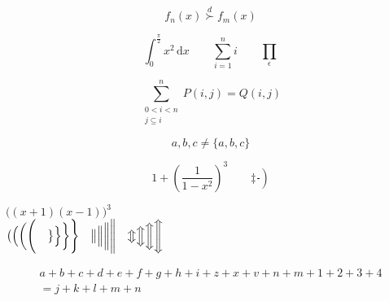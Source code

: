 \documentclass[a4paper,11pt]{report}
\begin{document}
\begin{equation*}
  f_n(x) \stackrel{d}{\succ} f_m(x)
\end{equation*}

\begin{equation*}
  \int_0^{\frac{\pi}{2}} x^2 \, \mathrm{d}x \qquad
  \sum_{i=1}^n i \qquad
  \prod_\epsilon
\end{equation*}

\begin{equation*}
  \sum^n_{\substack{0<i<n \\
                  j\subseteq i}}
  P(i,j) = Q(i,j)
\end{equation*}

\begin{equation*}
  {a,b,c} \neq \{a,b,c\}
\end{equation*}

\begin{equation*}
  1 + \left(\frac{1}{1-x^2}\right)^3 \qquad
  \left. \ddagger \frac{~}{~} \right)
\end{equation*}

$\Big((x+1)(x-1)\Big)^3$ \\
$\big(\Big(\bigg(\Bigg( \quad
 \big\}\Big\}\bigg\}\Bigg\} \quad
 \big\|\Big\|\bigg\|\Bigg\| \quad
 \big\Updownarrow \Big\Updownarrow \bigg\Updownarrow
 \Bigg\Updownarrow$

\begin{multline}
  a+b+c+d+e+f+g+h+i+z+x+v+n+m+1+2+3+4\\
  =j+k+l+m+n
\end{multline}
\end{document}
